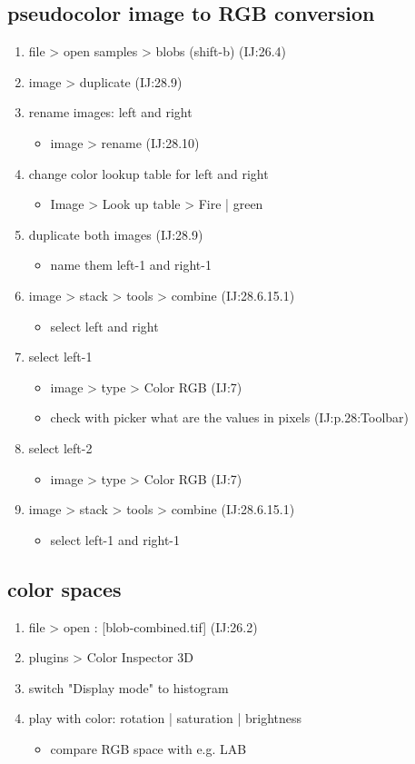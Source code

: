 \documentclass[11pt]{article}
\begin{document}
\subsection{pseudocolor image to RGB conversion}
\label{sec-1-7}
\begin{enumerate}
\item file > open samples > blobs (shift-b) (IJ:26.4)
\item image > duplicate (IJ:28.9)
\item rename images: left and right
\begin{itemize}
\item image > rename (IJ:28.10)
\end{itemize}
\item change color lookup table for left and right
\begin{itemize}
\item Image > Look up table > Fire | green
\end{itemize}
\item duplicate both images (IJ:28.9)
\begin{itemize}
\item name them left-1 and right-1
\end{itemize}
\item image > stack > tools > combine (IJ:28.6.15.1)
\begin{itemize}
\item select left and right
\end{itemize}
\item select left-1
\begin{itemize}
\item image > type > Color RGB (IJ:7)
\item check with picker what are the values in pixels (IJ:p.28:Toolbar)
\end{itemize}
\item select left-2
\begin{itemize}
\item image > type > Color RGB (IJ:7)
\end{itemize}
\item image > stack > tools > combine (IJ:28.6.15.1)
\begin{itemize}
\item select left-1 and right-1
\end{itemize}
\end{enumerate}

\subsection{color spaces}
\label{sec-1-8}
\begin{enumerate}
\item file > open : [blob-combined.tif] (IJ:26.2)
\item plugins > Color Inspector 3D
\item switch "Display mode" to histogram
\item play with color: rotation | saturation | brightness
\begin{itemize}
\item compare RGB space with e.g. LAB
\end{itemize}
\end{enumerate}
\end{document}
